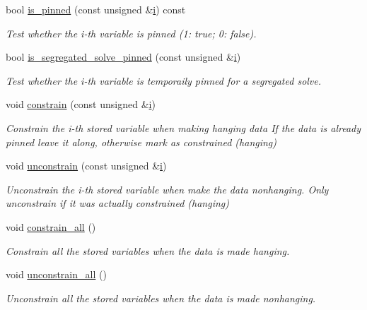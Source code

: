 \begin{DoxyCompactItemize}
bool \hyperlink{classoomph_1_1Data_aedd0c445396ddcd650c814d17fef77dc}{is\+\_\+pinned} (const unsigned \&\hyperlink{cfortran_8h_adb50e893b86b3e55e751a42eab3cba82}{i}) const
\begin{DoxyCompactList}\small\item\em Test whether the i-\/th variable is pinned (1\+: true; 0\+: false). \end{DoxyCompactList}\item 
bool \hyperlink{classoomph_1_1Data_a46bcce858da1ca61069329fda4876171}{is\+\_\+segregated\+\_\+solve\+\_\+pinned} (const unsigned \&\hyperlink{cfortran_8h_adb50e893b86b3e55e751a42eab3cba82}{i})
\begin{DoxyCompactList}\small\item\em Test whether the i-\/th variable is temporaily pinned for a segregated solve. \end{DoxyCompactList}\item 
void \hyperlink{classoomph_1_1Data_a210c28ac93988dd8dbbbd944f6138c35}{constrain} (const unsigned \&\hyperlink{cfortran_8h_adb50e893b86b3e55e751a42eab3cba82}{i})
\begin{DoxyCompactList}\small\item\em Constrain the i-\/th stored variable when making hanging data If the data is already pinned leave it along, otherwise mark as constrained (hanging) \end{DoxyCompactList}\item 
void \hyperlink{classoomph_1_1Data_accb670734a29a841e9ead16b703626ce}{unconstrain} (const unsigned \&\hyperlink{cfortran_8h_adb50e893b86b3e55e751a42eab3cba82}{i})
\begin{DoxyCompactList}\small\item\em Unconstrain the i-\/th stored variable when make the data nonhanging. Only unconstrain if it was actually constrained (hanging) \end{DoxyCompactList}\item 
void \hyperlink{classoomph_1_1Data_ab8a322d75fc3e744cc6c9e945232ff4e}{constrain\+\_\+all} ()
\begin{DoxyCompactList}\small\item\em Constrain all the stored variables when the data is made hanging. \end{DoxyCompactList}\item 
void \hyperlink{classoomph_1_1Data_a5e6a0d030f5e3230908f8a5eaf607082}{unconstrain\+\_\+all} ()
\begin{DoxyCompactList}\small\item\em Unconstrain all the stored variables when the data is made nonhanging. \end{DoxyCompactList}\item 

\end{DoxyCompactItemize}
